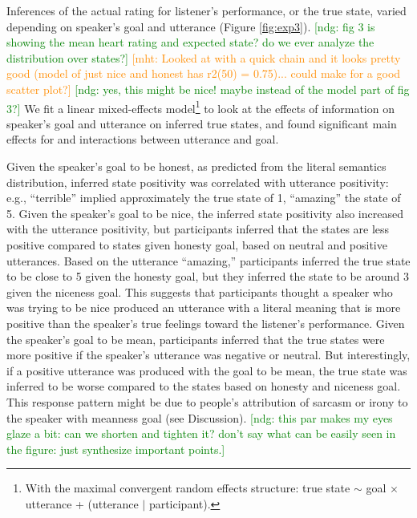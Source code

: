 \documentclass[10pt,letterpaper]{article}
\newcommand{\ndg}[1]{\textcolor{Green}{[ndg: #1]}}
\newcommand{\mht}[1]{\textcolor{DarkOrange}{[mht: #1]}}
\begin{document}
Inferences of the actual rating for listener's performance, or the true state, varied depending on speaker's goal and utterance (Figure \ref{fig:exp3}).
\ndg{fig 3 is showing the mean heart rating and expected state? do we ever analyze the distribution over states?}
\mht{Looked at with a quick chain and it looks pretty good (model of just nice and honest has r2(50) = 0.75)... could make for a good scatter plot?}
\ndg{yes, this might be nice! maybe instead of the model part of fig 3?}
We fit a linear mixed-effects model\footnote{With the maximal convergent random effects structure: true state $\sim$ goal $\times$ utterance + (utterance $|$ participant).} to look at the effects of information on speaker's goal and utterance on inferred true states, and found significant main effects for and interactions between utterance and goal. 

Given the speaker's goal to be honest, as predicted from the literal semantics distribution, inferred state positivity was correlated with utterance positivity: e.g., ``terrible'' implied approximately the true state of 1, ``amazing'' the state of 5. %
Given the speaker's goal to be nice, the inferred state positivity also increased with the utterance positivity, but participants inferred that the states are less positive compared to states given honesty goal, based on neutral and positive utterances. Based on the utterance ``amazing,'' participants inferred the true state to be close to 5 given the honesty goal, but they inferred the state to be around 3 given the niceness goal. This suggests that participants thought a speaker who was trying to be nice produced an utterance  with a literal meaning that is more positive than the speaker's true feelings toward the listener's performance.
Given the speaker's goal to be mean, participants inferred that the true states were more positive if the speaker's utterance was negative or neutral. 
But interestingly, if a positive utterance was produced with the goal to be mean, the true state was inferred to be worse compared to the states based on honesty and niceness goal. 
This response pattern might be due to people's attribution of sarcasm or irony to the speaker with meanness goal (see Discussion).
\ndg{this par makes my eyes glaze a bit: can we shorten and tighten it? don't say what can be easily seen in the figure: just synthesize important points.}
\end{document}

